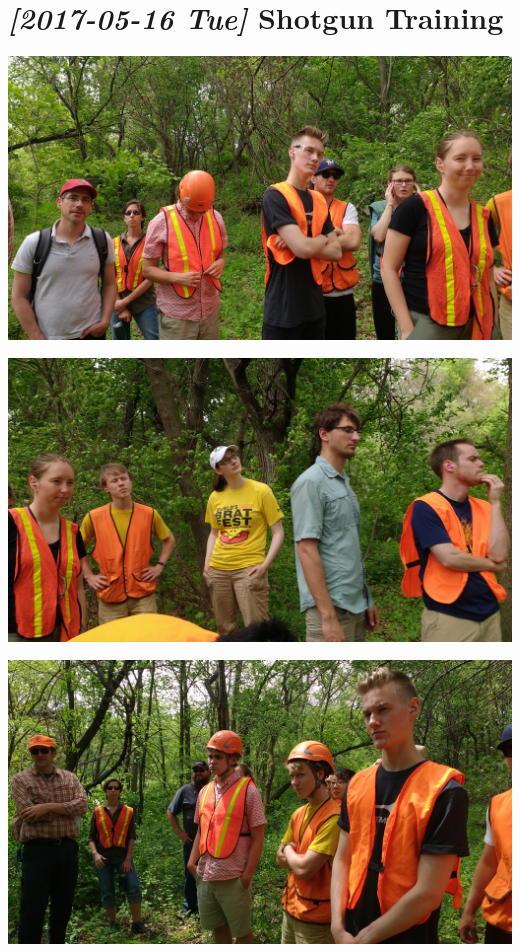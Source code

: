\documentclass{article}
\begin{document}
\section*{\textit{[2017-05-16 Tue] } Shotgun Training}
\label{sec:org923a9dc}
\begin{center}
\includegraphics[width=.9\linewidth]{blog_imgs/ShotgunTraining/IMG_20170516_143233224.jpg}
\end{center}

\begin{center}
\includegraphics[width=.9\linewidth]{blog_imgs/ShotgunTraining/IMG_20170516_143231350.jpg}
\end{center}

\begin{center}
\includegraphics[width=.9\linewidth]{blog_imgs/ShotgunTraining/IMG_20170516_140129558.jpg}
\end{center}
\end{document}

